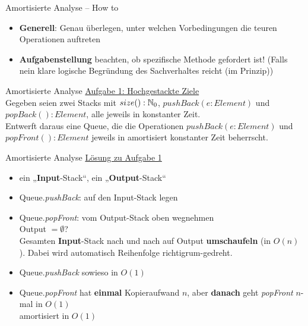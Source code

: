 \begin{frame}{Amortisierte Analyse – How to}
	\begin{itemize}
		\item \textbf{Generell}: Genau überlegen, unter welchen Vorbedingungen die teuren Operationen auftreten
		\item \textbf{Aufgabenstellung} beachten, ob spezifische Methode gefordert ist! (Falls nein \impl klare logische Begründung des Sachverhaltes reicht (im Prinzip))
	\end{itemize}
\end{frame}



\begin{frame}{Amortisierte Analyse}
	\underline{Aufgabe 1: Hochgestackte Ziele} \\
	Gegeben seien zwei Stacks mit $size() : \mathbb{N}_0$, $pushBack(e : Element)$ und $popBack() : Element$, alle jeweils in konstanter Zeit. \\
	Entwerft daraus eine Queue, die die Operationen $pushBack(e : Element)$ und $popFront() : Element$ jeweils in amortisiert konstanter Zeit beherrscht.
\end{frame}

\begin{frame}{Amortisierte Analyse}
	\underline{Lösung zu Aufgabe 1} \\
	\begin{itemize}
		\item ein „\textbf{Input}-Stack“, ein „\textbf{Output}-Stack“
		\item Queue.\textit{pushBack}: auf den Input-Stack legen
		\item Queue.\textit{popFront}: vom Output-Stack oben wegnehmen \\ 
		\pause
			  Output $= \emptyset$? \\
			  \impl Gesamten \textbf{Input}-Stack nach und nach auf Output \textbf{umschaufeln} (in $O(n)$). Dabei wird automatisch Reihenfolge richtigrum-gedreht. 
		\pause
		\item Queue.\textit{pushBack} sowieso in $O(1)$
		\pause
		\item Queue.\textit{popFront} hat \textbf{einmal} Kopieraufwand $n$, aber \textbf{danach} geht \textit{popFront} $n$-mal in $O(1)$ \\
		\pause
		\impl amortisiert in $O(1)$
	\end{itemize}
\end{frame}




